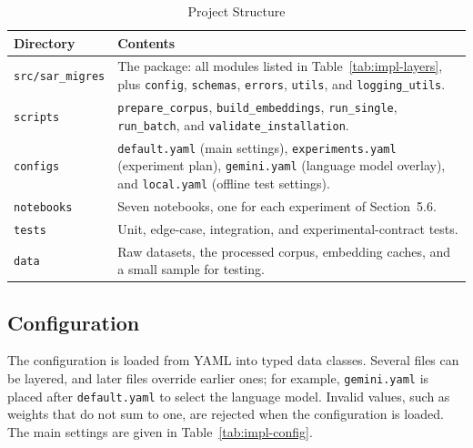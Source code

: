 \documentclass[12pt,a4paper]{report}
\begin{document}
\begin{table}[H]
\centering
\caption{Project Structure}
\label{tab:impl-structure}
\renewcommand{\arraystretch}{1.2}
\begin{tabular}{|p{1.45in}|p{4.6in}|}
\hline
\textbf{Directory} & \textbf{Contents} \\ \hline
\texttt{src/sar\_migres} & The package: all modules listed in Table~\ref{tab:impl-layers}, plus \texttt{config}, \texttt{schemas}, \texttt{errors}, \texttt{utils}, and \texttt{logging\_utils}. \\ \hline
\texttt{scripts} & \texttt{prepare\_corpus}, \texttt{build\_embeddings}, \texttt{run\_single}, \texttt{run\_batch}, and \texttt{validate\_installation}. \\ \hline
\texttt{configs} & \texttt{default.yaml} (main settings), \texttt{experiments.yaml} (experiment plan), \texttt{gemini.yaml} (language model overlay), and \texttt{local.yaml} (offline test settings). \\ \hline
\texttt{notebooks} & Seven notebooks, one for each experiment of Section~5.6. \\ \hline
\texttt{tests} & Unit, edge-case, integration, and experimental-contract tests. \\ \hline
\texttt{data} & Raw datasets, the processed corpus, embedding caches, and a small sample for testing. \\ \hline
\end{tabular}
\end{table}

\subsection{Configuration}

The configuration is loaded from YAML into typed data classes. Several files can be layered, and later files override earlier ones; for example, \texttt{gemini.yaml} is placed after \texttt{default.yaml} to select the language model. Invalid values, such as weights that do not sum to one, are rejected when the configuration is loaded. The main settings are given in Table~\ref{tab:impl-config}.
\end{document}
